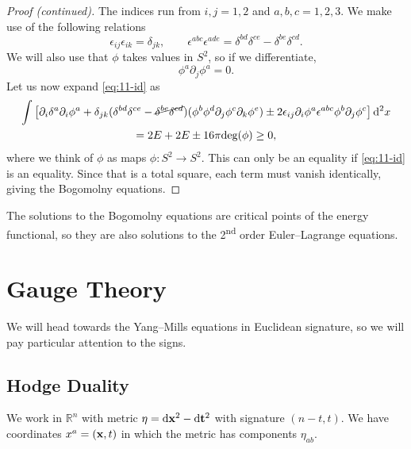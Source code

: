 
\begin{proof}[Proof (continued)]
  The indices run from $i, j = 1, 2$ and $a, b, c = 1, 2, 3$.
  We make use of the following relations
  \begin{equation}
    \epsilon_{ij} \epsilon_{ik} = \delta_{jk},  \qquad
    \epsilon^{abc} \epsilon^{ade} = \delta^{bd} \delta^{ce} - \delta^{be} \delta^{cd}.
  \end{equation}
  We will also use that $\phi$ takes values in $S^2$, so if we differentiate,
  \begin{equation}
    \phi^{a} \partial_{j} \phi^{a} = 0.
  \end{equation}
  Let us now expand \eqref{eq:11-id} as
  \begin{multline}
    \int \left[ \partial_{i} \delta^{a} \partial_{i} \phi^{a} + \delta_{jk} (\delta^{bd} \delta^{ce} - \cancel{\delta^{be} \delta^{cd}}) (\phi^{b} \phi^{d} \partial_{j} \phi^{c} \partial_{k} \phi^{e}) \pm 2 \epsilon_{ij} \partial_{i} \phi^{a} \epsilon^{abc} \phi^{b} \partial_{j} \phi^{c} \right] \dd[2]{x} \\
    = 2 E + 2 E \pm 16 \pi \text{deg}(\phi) \geq 0,
  \end{multline}
  where we think of $\phi$ as maps $\phi\colon S^2 \to S^2$.
  This can only be an equality if \eqref{eq:11-id} is an equality. Since that is a total square, each term must vanish identically, giving the Bogomolny equations.
\end{proof}
The solutions to the Bogomolny equations are critical points of the energy functional, so they are also solutions to the 2\textsuperscript{nd} order Euler--Lagrange equations.

\chapter{Gauge Theory}%
\label{cha:gauge_theory}

We will head towards the Yang--Mills equations in Euclidean signature, so we will pay particular attention to the signs.

\section{Hodge Duality}%
\label{sec:hodge_duality}

We work in $\mathbb{R}^n$ with metric $\eta = \dd{\vb{x}^2} - \dd{\vb{t}^2}$ with signature $(n - t, t)$.
We have coordinates $x^{a} = (\vb{x}, t)$ in which the metric has components $\eta_{ab}$.

